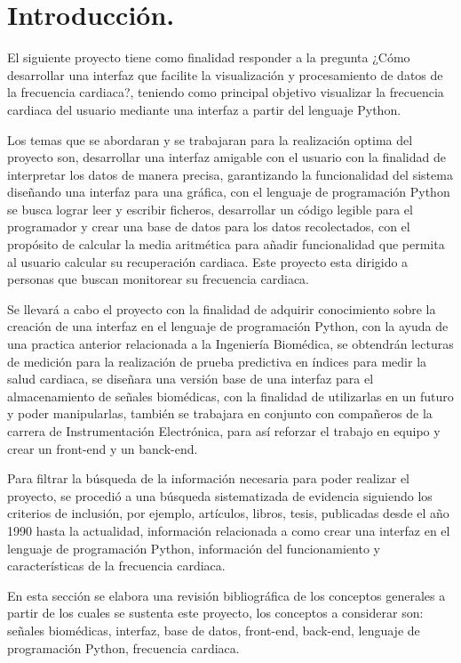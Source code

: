 \documentclass[14pt]{report}
\begin{document}
	\section{Introducción.}
		El siguiente proyecto tiene como finalidad responder a la pregunta ¿Cómo desarrollar una interfaz que facilite la visualización y procesamiento de datos de la frecuencia cardiaca?, teniendo como principal objetivo visualizar la frecuencia cardiaca del usuario mediante una interfaz a partir del lenguaje Python. 
		
		Los temas que se abordaran y se trabajaran para la realización optima del proyecto son, desarrollar una interfaz amigable con el usuario con la finalidad de interpretar los datos de manera precisa, garantizando la funcionalidad del sistema diseñando una interfaz para una gráfica, con el lenguaje de programación Python se busca lograr leer y escribir ficheros, desarrollar un código legible para el programador y crear una base de datos para los datos recolectados, con el propósito de calcular la media aritmética para añadir funcionalidad que permita al usuario calcular su recuperación cardiaca. Este proyecto esta dirigido a personas que buscan monitorear su frecuencia cardiaca.  
		
		Se llevará a cabo el proyecto con la finalidad de adquirir conocimiento sobre la creación de una interfaz en el lenguaje de programación Python, con la ayuda de una practica anterior relacionada a la Ingeniería Biomédica, se obtendrán lecturas de medición para la realización de prueba predictiva en índices para medir la salud cardiaca, se diseñara una versión base de una interfaz para el almacenamiento de señales biomédicas, con la finalidad de utilizarlas en un futuro y poder manipularlas, también se trabajara en conjunto con compañeros de la carrera de Instrumentación Electrónica, para así reforzar el trabajo en equipo y crear un front-end y un banck-end. 
		
		Para filtrar la búsqueda de la información necesaria para poder realizar el proyecto, se procedió a una búsqueda sistematizada de evidencia siguiendo los criterios de inclusión, por ejemplo, artículos, libros, tesis, publicadas desde el año 1990 hasta la actualidad, información relacionada a como crear una interfaz en el lenguaje de programación Python, información del funcionamiento y características de la frecuencia cardiaca. 
		
		En esta sección se elabora una revisión bibliográfica de los conceptos generales a partir de los cuales se sustenta este proyecto, los conceptos a considerar son: señales biomédicas, interfaz, base de datos, front-end, back-end, lenguaje de programación Python, frecuencia cardiaca. 	
\end{document}
